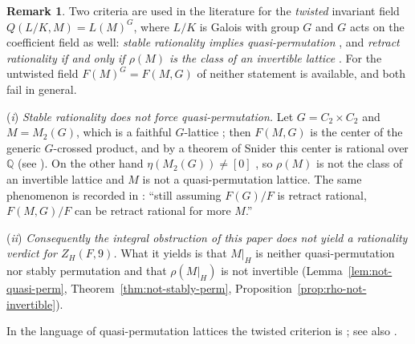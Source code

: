 \documentclass[12pt,a4paper]{article}
\theoremstyle{definition}
\newtheorem{remark}[theorem]{Remark}
\begin{document}
\begin{remark}\label{rem:untwisted-criteria}
Two criteria are used in the literature for the \emph{twisted} invariant
field \(Q(L/K,M) = L(M)^G\), where \(L/K\) is Galois with group \(G\) and
\(G\) acts on the coefficient field as well: \emph{stable rationality
implies quasi-permutation} \cite[Theorem~1.6]{EndoMiyata1973a}
\cite[Theorem~1.3(b)]{Saltman1987}, and \emph{retract rationality if and
only if \(\rho(M)\) is the class of an invertible lattice}
\cite[Theorem~3.14(a)]{Saltman1984}.  For the untwisted field
\(F(M)^G = F(M,G)\) of \cite[p.~221]{Saltman1987} neither statement is
available, and both fail in general.

\smallskip
\noindent(\emph{i}) \emph{Stable rationality does not force
quasi-permutation.}  Let \(G = C_2 \times C_2\) and \(M = M_2(G)\),
which is a faithful \(G\)-lattice \cite{Saltman1987}; then \(F(M,G)\) is
the center of the generic \(G\)-crossed product, and by a theorem of
Snider \cite{Snider1979} this center is rational over \(\mathbb{Q}\)
(see \cite[Introduction]{OfirDavid2016}).  On the other hand
\(\eta(M_2(G)) \neq [0]\) \cite[Theorems~2.6 and 2.7]{Saltman1984}, so
\(\rho(M)\) is not the class of an invertible lattice and \(M\) is not a
quasi-permutation lattice.  The same phenomenon is recorded in
\cite[p.~226]{Saltman1987}: ``still assuming \(F(G)/F\) is retract
rational, \(F(M,G)/F\) can be retract rational for more \(M\).''

\smallskip
\noindent(\emph{ii}) \emph{Consequently the integral obstruction of this
paper does not yield a rationality verdict for \(Z_H(F,9)\).}  What it
yields is that \(M|_H\) is neither quasi-permutation nor stably
permutation and that \(\rho(M|_H)\) is not invertible
(Lemma~\ref{lem:not-quasi-perm}, Theorem~\ref{thm:not-stably-perm},
Proposition~\ref{prop:rho-not-invertible}).
\end{remark}

In the language of quasi-permutation lattices the twisted criterion is
\cite[Theorem~1.6]{EndoMiyata1973a}; see also
\cite[\S1]{EndoMiyata1973b}.

\end{document}
